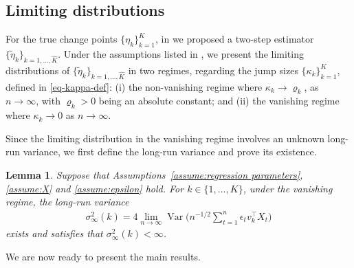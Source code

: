 \documentclass[11pt]{article}
\DeclareMathOperator*{\var}{Var}
\theoremstyle{plain}
\newtheorem{lemma}[theorem]{Lemma}
\theoremstyle{definition}
\begin{document}
\subsection{Limiting distributions} \label{sec:main_result}

For the true change points $\{\eta_k\}_{k = 1}^K$, in  we proposed a two-step estimator $\{\widetilde{\eta}_k\}_{k = 1, \ldots, \widehat{K}}$.  Under the assumptions listed in , we present the limiting distributions of $\{\widetilde{\eta}_k\}_{k = 1, \ldots, \widehat{K}}$ in two regimes, regarding the jump sizes $\{\kappa_k\}_{k = 1}^K$, defined in \eqref{eq-kappa-def}: (i) the non-vanishing regime where $\kappa_k \to \varrho_k$, as $n \to \infty$, with $\varrho_k > 0$ being an absolute constant; and (ii) the vanishing regime where $\kappa_k \to 0$ as $n \to \infty$.

Since the limiting distribution in the vanishing regime involves an unknown long-run variance, we first define the long-run variance and prove its existence.

\begin{lemma}\label{lemma:long-run_UB}
Suppose that Assumptions~\ref{assume:regression parameters}, \ref{assume:X} and \ref{assume:epsilon} hold.  For $k \in \{1, \ldots, K\}$, under the vanishing regime, the long-run variance
\begin{align}\label{eq:long-run_var}
    \sigma_{\infty}^2(k)
    = 4\lim_{n \to \infty}\var\bigg(n^{-1/2}\sum_{t = 1}^n \epsilon_tv_k^{\top}X_t  \bigg)
\end{align}
exists and satisfies that $\sigma^2_{\infty}(k) < \infty$. 
\end{lemma}

We are now ready to present the main results.     
\end{document}
